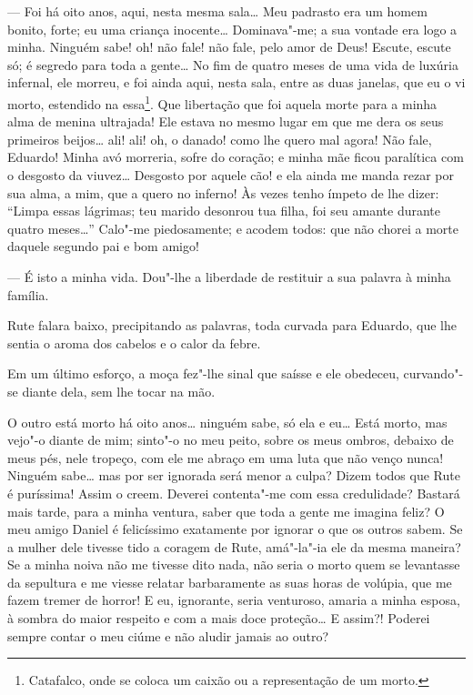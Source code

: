 --- Foi há oito anos, aqui, nesta mesma sala\ldots{} Meu padrasto era um homem
bonito, forte; eu uma criança inocente\ldots{} Dominava"-me; a sua vontade era
logo a minha. Ninguém sabe! oh! não fale! não fale, pelo amor de Deus!
Escute, escute só; é segredo para toda a gente\ldots{} No fim de quatro meses
de uma vida de luxúria infernal, ele morreu, e foi ainda aqui, nesta
sala, entre as duas janelas, que eu o vi morto, estendido na
essa\footnote{Catafalco, onde se coloca um caixão ou a representação de
  um morto.}. Que libertação que foi aquela morte para a minha alma de
menina ultrajada! Ele estava no mesmo lugar em que me dera os seus
primeiros beijos\ldots{} ali! ali! oh, o danado! como lhe quero mal agora!
Não fale, Eduardo! Minha avó morreria, sofre do coração; e minha mãe
ficou paralítica com o desgosto da viuvez\ldots{} Desgosto por aquele cão! e
ela ainda me manda rezar por sua alma, a mim, que a quero no inferno! Às
vezes tenho ímpeto de lhe dizer: ``Limpa essas lágrimas; teu marido
desonrou tua filha, foi seu amante durante quatro meses\ldots{}'' Calo"-me
piedosamente; e acodem todos: que não chorei a morte daquele segundo pai
e bom amigo!

\asterisc

--- É isto a minha vida. Dou"-lhe a liberdade de restituir a sua palavra
à minha família.

Rute falara baixo, precipitando as palavras, toda curvada para Eduardo,
que lhe sentia o aroma dos cabelos e o calor da febre.

Em um último esforço, a moça fez"-lhe sinal que saísse e ele obedeceu,
curvando"-se diante dela, sem lhe tocar na mão.

\asterisc

O outro está morto há oito anos\ldots{} ninguém sabe, só ela e eu\ldots{} Está
morto, mas vejo"-o diante de mim; sinto"-o no meu peito, sobre os meus
ombros, debaixo de meus pés, nele tropeço, com ele me abraço em uma luta
que não venço nunca! Ninguém sabe\ldots{} mas por ser ignorada será menor a
culpa? Dizem todos que Rute é puríssima! Assim o creem. Deverei
contenta"-me com essa credulidade? Bastará mais tarde, para a minha
ventura, saber que toda a gente me imagina feliz? O meu amigo Daniel é
felicíssimo exatamente por ignorar o que os outros sabem. Se a mulher
dele tivesse tido a coragem de Rute, amá"-la"-ia ele da mesma maneira? Se
a minha noiva não me tivesse dito nada, não seria o morto quem se
levantasse da sepultura e me viesse relatar barbaramente as suas horas
de volúpia, que me fazem tremer de horror! E eu, ignorante, seria
venturoso, amaria a minha esposa, à sombra do maior respeito e com a
mais doce proteção\ldots{} E assim?! Poderei sempre contar o meu ciúme e não
aludir jamais ao outro?

